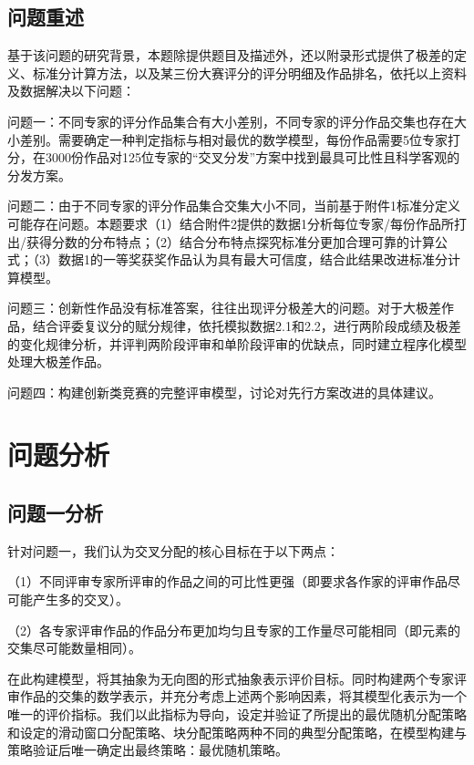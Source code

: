 \documentclass[bwprint]{gmcmthesis}
\begin{document}
\subsection{问题重述}
\par
基于该问题的研究背景，本题除提供题目及描述外，还以附录形式提供了极差的定义、标准分计算方法，以及某三份大赛评分的评分明细及作品排名，依托以上资料及数据解决以下问题：
\par
问题一：不同专家的评分作品集合有大小差别，不同专家的评分作品交集也存在大小差别。需要确定一种判定指标与相对最优的数学模型，每份作品需要5位专家打分，在3000份作品对125位专家的“交叉分发”方案中找到最具可比性且科学客观的分发方案。
\par
问题二：由于不同专家的评分作品集合交集大小不同，当前基于附件1标准分定义可能存在问题。本题要求（1）结合附件2提供的数据1分析每位专家/每份作品所打出/获得分数的分布特点；（2）结合分布特点探究标准分更加合理可靠的计算公式；（3）数据1的一等奖获奖作品认为具有最大可信度，结合此结果改进标准分计算模型。
\par
问题三：创新性作品没有标准答案，往往出现评分极差大的问题。对于大极差作品，结合评委复议分的赋分规律，依托模拟数据2.1和2.2，进行两阶段成绩及极差的变化规律分析，并评判两阶段评审和单阶段评审的优缺点，同时建立程序化模型处理大极差作品。
\par
问题四：构建创新类竞赛的完整评审模型，讨论对先行方案改进的具体建议。
\newpage
\section{问题分析}

\subsection{问题一分析}
\par
针对问题一，我们认为交叉分配的核心目标在于以下两点：
\par
（1）不同评审专家所评审的作品之间的可比性更强（即要求各作家的评审作品尽可能产生多的交叉）。
\par
（2）各专家评审作品的作品分布更加均匀且专家的工作量尽可能相同（即元素的交集尽可能数量相同）。
\par
在此构建模型，将其抽象为无向图的形式抽象表示评价目标。同时构建两个专家评审作品的交集的数学表示，并充分考虑上述两个影响因素，将其模型化表示为一个唯一的评价指标。我们以此指标为导向，设定并验证了所提出的最优随机分配策略和设定的滑动窗口分配策略、块分配策略两种不同的典型分配策略，在模型构建与策略验证后唯一确定出最终策略：最优随机策略。
\end{document}
